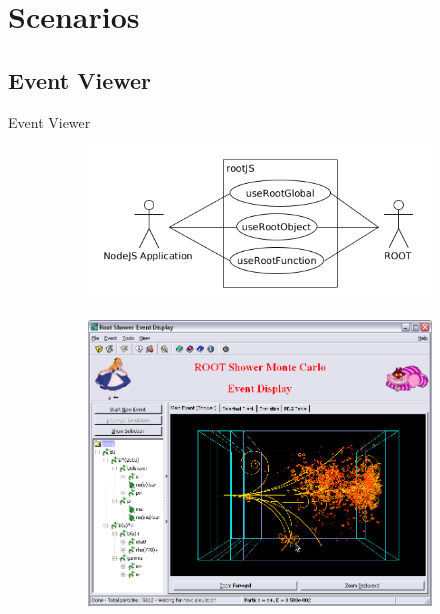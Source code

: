 \section{Scenarios}
\subsection{Event Viewer}
\begin{frame}{Event Viewer}

  \begin{figure}[htb]
    \centering
    \begin{subfigure}[b]{0.5\textwidth}
      \includegraphics[width=0.97\linewidth, keepaspectratio]{./resources/usecaseOverview.png}
    \end{subfigure}%
    \begin{subfigure}[b]{0.5\textwidth}
      \includegraphics[width=0.97\linewidth, keepaspectratio]{./resources/shower_event_viewer.png}
      \nocite{cern:eventviewer}
    \end{subfigure}
  \end{figure}
\end{frame}

